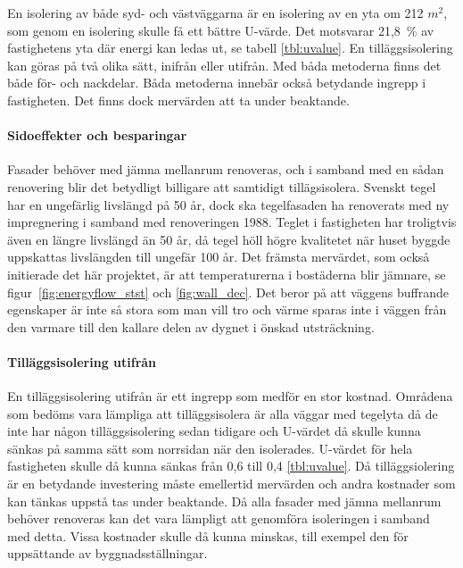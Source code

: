 En isolering av både syd- och västväggarna är en isolering av en yta om 212 $\unit{m^2}$, som genom en isolering skulle få ett bättre U-värde. Det motsvarar 21,8~\% av fastighetens yta där energi kan ledas ut, se tabell \ref{tbl:uvalue}.
En tilläggsisolering kan göras på två olika sätt, inifrån eller utifrån. Med båda metoderna finns det både för- och nackdelar. Båda metoderna innebär också betydande ingrepp i fastigheten. Det finns dock mervärden att ta under beaktande. 

\paragraph{Sidoeffekter och besparingar}
Fasader behöver med jämna mellanrum renoveras, och i samband med en sådan renovering blir det betydligt billigare att samtidigt tillägsisolera. Svenskt tegel har en ungefärlig livslängd på 50 år\cite{magnus}, dock ska tegelfasaden ha renoverats med ny impregnering i samband med renoveringen 1988. Teglet i fastigheten har troligtvis även en längre livslängd än 50 år,  då tegel höll högre kvalitetet när huset byggde uppskattas livslängden till ungefär 100 år.
Det främsta mervärdet, som också initierade det här projektet, är att temperaturerna i bostäderna blir jämnare, se figur~\ref{fig:energyflow_stst} och \ref{fig:wall_dec}. 
Det beror på att väggens buffrande egenskaper är inte så stora som man vill tro och värme sparas inte i väggen från den varmare till den kallare delen av dygnet i önskad utsträckning.

\paragraph{Tilläggsisolering utifrån}
En tilläggsisolering utifrån är ett ingrepp som medför en stor kostnad. Områdena som bedöms vara lämpliga att tilläggsisolera är alla väggar med tegelyta då de inte har någon tilläggsisolering sedan tidigare och U-värdet då skulle kunna sänkas på samma sätt som norrsidan när den isolerades. U-värdet för hela fastigheten skulle då kunna sänkas från 0,6 till 0,4 \ref{tbl:uvalue}. Då tilläggsiolering är en betydande investering måste emellertid mervärden och andra kostnader som kan tänkas uppstå tas under beaktande. Då alla fasader med jämna mellanrum behöver renoveras kan det vara lämpligt att genomföra isoleringen i samband med detta. Vissa kostnader skulle då kunna minskas, till exempel den för uppsättande av byggnadsställningar.

